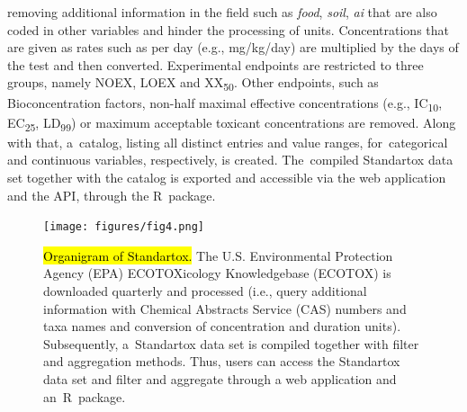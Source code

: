 \documentclass[data,datadescriptor,accept,moreauthors,pdftex]{Definitions/mdpi}
\begin{document}
removing additional information in the field such as \textit{food}, \textit{soil}, \textit{ai} that are also coded in other variables and hinder the processing of units. Concentrations that are given as rates such as per day (e.g., mg/kg/day) are multiplied by the days of the test and then converted. Experimental endpoints are restricted to three groups, namely NOEX, LOEX and XX\textsubscript{50}. Other endpoints, such as Bioconcentration factors, non-half maximal effective concentrations (e.g., IC\textsubscript{10}, EC\textsubscript{25}, LD\textsubscript{99}) or maximum acceptable toxicant concentrations are removed. Along with that, a~catalog, listing all distinct entries and value ranges, for~categorical and continuous variables, respectively, is created. The~compiled Standartox data set together with the catalog is exported and accessible via the web application and the API, through the R~package.

\begin{figure}[H]
    \centering
    \texttt{[image: figures/fig4.png]}
    \caption{\hl{Organigram of Standartox.} The U.S. Environmental Protection Agency (EPA) ECOTOXicology Knowledgebase (ECOTOX) is downloaded quarterly and processed (i.e., query additional information with Chemical Abstracts Service (CAS) numbers 
    and taxa names and conversion of concentration and duration units). Subsequently, a~Standartox data set is compiled together with filter and aggregation methods. Thus, users can access the Standartox data set and filter and aggregate through a web application and an~R~package.} %

    \label{fig:stx-organigram}
\end{figure}
\unskip
\end{document}
